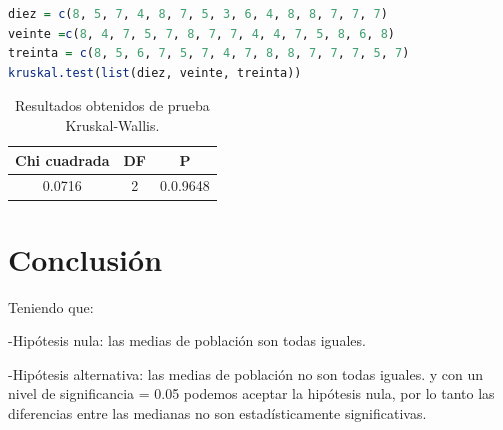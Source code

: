 \documentclass{article}
\begin{document}
\begin{lstlisting}[language=R, caption= Fragmento de c\'odigo utilizado para hacer pruebas de Kruskal Wallis.]
diez = c(8, 5, 7, 4, 8, 7, 5, 3, 6, 4, 8, 8, 7, 7, 7)
veinte =c(8, 4, 7, 5, 7, 8, 7, 7, 4, 4, 7, 5, 8, 6, 8)
treinta = c(8, 5, 6, 7, 5, 7, 4, 7, 8, 8, 7, 7, 7, 5, 7)
kruskal.test(list(diez, veinte, treinta))
\end{lstlisting}

\begin{table}[ht]
    \centering
    \caption{Resultados obtenidos de prueba Kruskal-Wallis.} 
    \begin{tabular}{|c|c|c|}
    \hline
    Chi cuadrada & DF & P  \\
    \hline
    0.0716 & 2 & 0.0.9648 \\
    \hline
\end{tabular}
    \label{cuadro 3}
\end{table}

\newpage

\section{Conclusi\'on}
Teniendo que:

-Hip\'otesis nula: las medias de poblaci\'on son todas iguales.

-Hip\'otesis alternativa: las medias de poblaci\'on no son todas iguales.
y con un nivel de significancia = 0.05 podemos aceptar la hip\'otesis nula, por lo tanto las diferencias entre las medianas no son estad\'isticamente significativas.



\end{document}
